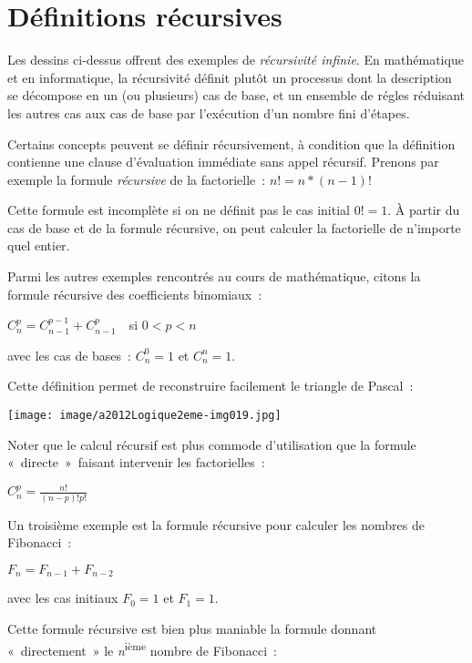 \section{Définitions récursives}

	Les dessins ci-dessus offrent des exemples de \textit{récursivité infinie}. 
	En mathématique et en informatique, la récursivité définit plutôt un 
	processus dont la description se décompose en un (ou plusieurs) cas de base, 
	et un	ensemble de régles réduisant les autres cas aux cas de base 
	par l'exécution d'un nombre fini d'étapes.

	Certains concepts peuvent se définir récursivement, 
	à condition que la définition contienne une clause d'évaluation
	immédiate sans appel récursif. Prenons par exemple la formule 
	\textit{récursive} de la factorielle~: 
	$n! = n*(n-1)!$

	Cette formule est incomplète si on ne définit pas le cas initial 
	$0! = 1$. À partir du cas de base et de la formule
	récursive, on peut calculer la factorielle de n'importe quel entier.

	Parmi les autres exemples rencontrés au cours de mathématique, 
	citons la formule récursive des coefficients binomiaux~:


	{\centering
	 $C_n^p=C_{n-1}^{p-1}+C_{n-1}^p$\ \ si $0<p<n$
	\par}

	avec les cas de bases~: $C_n^0=1$ et $C_n^n=1$. 
	
	Cette définition permet de reconstruire facilement le triangle de Pascal~:

	\begin{center}
	\texttt{[image: image/a2012Logique2eme-img019.jpg]}
	\end{center}

	Noter que le calcul récursif est plus commode d'utilisation 
	que la formule «~directe~»~faisant intervenir les
	factorielles~:

	{\centering
	$C_n^p=\frac{n!}{(n-p)!p!}$
	\par}
	
	Un troisième exemple est la formule récursive pour 
	calculer les nombres de Fibonacci~:
	
	{\centering
	$F_n=F_{n-1}+F_{n-2}$
	\par}
	
	avec les cas initiaux $F_0 = 1$ et $F_1 = 1$. 
	
	Cette formule récursive est bien plus maniable la formule 
	donnant «~directement~» le \textit{n}\textsuperscript{ième} 
	nombre de Fibonacci~:
	
